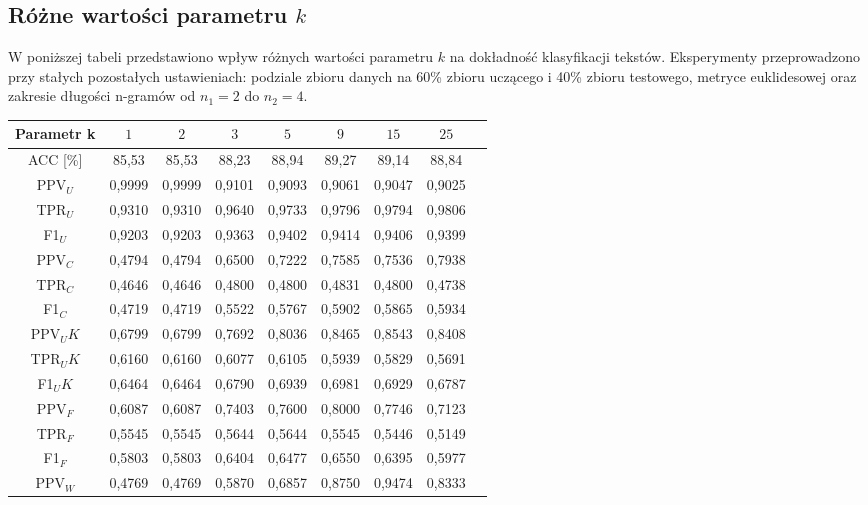 \documentclass{article}
\begin{document}
\subsection{Różne wartości parametru \(k\)}
W poniższej tabeli przedstawiono wpływ różnych wartości parametru \(k\) na dokładność klasyfikacji tekstów. Eksperymenty przeprowadzono przy stałych pozostałych ustawieniach: podziale zbioru danych na 60\% zbioru uczącego i 40\% zbioru testowego, metryce euklidesowej oraz zakresie długości n-gramów od \(n_1 = 2\) do \(n_2 = 4\). \\
\begin{table}[h!]
    \centering
    \begin{tabular}{|c|c|c|c|c|c|c|c|c|}
    \hline
    \textbf{Parametr k} & \textbf{\(1\)} & \textbf{\(2\)} & \textbf{\(3\)} & \textbf{\(5\)}  & \textbf{\(9\)}  & \textbf{\(15\)} & \textbf{\(25\)} \\ \hline
    ACC [\%] & 85,53 & 85,53 & 88,23 & 88,94 & 89,27 & 89,14 & 88,84\\ \hline
    PPV\(_U\) & 0,9999 & 0,9999 & 0,9101 & 0,9093 & 0,9061 & 0,9047 & 0,9025\\ \hline
    TPR\(_U\) & 0,9310 & 0,9310 & 0,9640 & 0,9733 & 0,9796& 0,9794 & 0,9806\\ \hline
    F1\(_U\) & 0,9203 & 0,9203 & 0,9363 & 0,9402 & 0,9414& 0,9406 & 0,9399\\ \hline
    PPV\(_C\) & 0,4794 & 0,4794 & 0,6500 &  0,7222 & 0,7585& 0,7536& 0,7938\\ \hline
    TPR\(_C\) & 0,4646 & 0,4646 & 0,4800 &  0,4800& 0,4831& 0,4800& 0,4738\\ \hline
    F1\(_C\) & 0,4719 & 0,4719 & 0,5522 &  0,5767& 0,5902& 0,5865& 0,5934\\ \hline
    PPV\(_UK\) & 0,6799 & 0,6799 & 0,7692 & 0,8036& 0,8465& 0,8543& 0,8408\\ \hline
    TPR\(_UK\) & 0,6160 & 0,6160 & 0,6077 &  0,6105& 0,5939& 0,5829& 0,5691\\ \hline
    F1\(_UK\) & 0,6464 & 0,6464 & 0,6790 &  0,6939& 0,6981& 0,6929& 0,6787\\ \hline
    PPV\(_F\) & 0,6087 & 0,6087 & 0,7403 & 0,7600& 0,8000& 0,7746& 0,7123\\ \hline
    TPR\(_F\) & 0,5545 & 0,5545 & 0,5644 & 0,5644& 0,5545& 0,5446& 0,5149\\ \hline
    F1\(_F\) & 0,5803 & 0,5803 & 0,6404 &  0,6477& 0,6550& 0,6395& 0,5977\\ \hline
    PPV\(_W\) & 0,4769 & 0,4769 & 0,5870 & 0,6857& 0,8750& 0,9474& 0,8333\\ \hline

\end{tabular}
\end{table}
\end{document}
